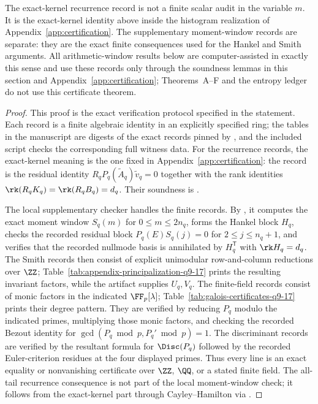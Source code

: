 \begin{theorem}
The exact-kernel recurrence record is not a finite scalar audit in the variable
\(m\).  It is the exact-kernel identity above inside the histogram realization
of Appendix~\ref{app:certification}.  The supplementary moment-window records
are separate: they are the exact finite consequences used for the Hankel and
Smith arguments.  All arithmetic-window results below are computer-assisted in
exactly this sense and use these records only through the soundness lemmas in
this section and Appendix~\ref{app:certification};
Theorems~A--F and the entropy ledger do not use this certificate theorem.
\end{theorem}

\begin{proof}
This proof is the exact verification protocol specified in the statement.  Each
record is a finite algebraic identity in an explicitly specified ring; the
tables in the manuscript are digests of the exact records pinned by
, and the included script checks
the corresponding full witness data.
For the recurrence records, the exact-kernel meaning is the one fixed in
Appendix~\ref{app:certification}: the record is the residual identity
\(R_qP_q(\widetilde A_q)\widetilde v_q=0\) together with the rank identities
\(\rk(R_qK_q)=\rk(R_qB_q)=d_q\).  Their soundness is
.

The local supplementary checker handles the finite records.  By
, it computes the exact moment window
\(S_q(m)\) for \(0\le m\le 2n_q\), forms the Hankel block \(H_q\), checks the
recorded residual block \(P_q(E)S_q(j)=0\) for \(2\le j\le n_q+1\), and
verifies that the recorded nullmode basis is annihilated by
\(H_q^{\mathsf T}\) with \(\rk H_q=d_q\).  The Smith records then consist of
explicit unimodular row-and-column reductions over
\(\ZZ\); Table~\ref{tab:appendix-principalization-q9-17} prints the resulting
invariant factors, while the artifact supplies \(U_q,V_q\).  The finite-field
records consist of monic factors in the indicated \(\FF_p[\lambda]\);
Table~\ref{tab:galois-certificates-q9-17} prints their degree pattern.  They
are verified by reducing \(P_q\) modulo the indicated primes, multiplying those
monic factors, and checking the recorded Bezout identity for
\(\gcd(P_q\bmod p,P_q'\bmod p)=1\).  The discriminant records are verified by
the resultant formula for \(\Disc(P_q)\) followed by the recorded
Euler-criterion residues at the four displayed primes.  Thus every line is an
exact equality or nonvanishing certificate over \(\ZZ\), \(\QQ\), or a stated
finite field.  The all-tail
recurrence consequence is not part of the local moment-window check; it follows
from the exact-kernel part through Cayley--Hamilton via
.
\end{proof}

